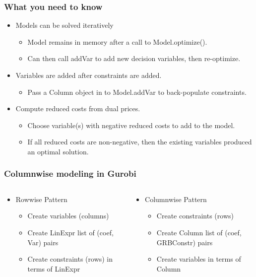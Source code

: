 \documentclass[12pt,handout]{beamer}
\begin{document}
\begin{frame}
\frametitle {What you need to know}
\begin{itemize}
\item Models can be solved iteratively
	\begin{itemize}
	\item Model remains in memory after a call to Model.optimize().
	\item Can then call addVar to add new decision variables, then re-optimize.
	\end{itemize}
\item Variables are added after constraints are added.
     \begin{itemize}
     \item Pass a Column object in to Model.addVar to back-populate constraints.
     \end{itemize}
\item Compute reduced costs from dual prices.
     \begin{itemize}
     \item Choose variable(s) with negative reduced costs to add to the model.
     \item If all reduced costs are non-negative, then the existing variables produced an optimal solution.
     \end{itemize}
\end{itemize}
\end{frame}

\begin{frame}
\frametitle {Columnwise modeling in Gurobi}
\begin{columns}

\begin{column}{0.5\textwidth}
\begin{itemize}
  \item Rowwise Pattern
  \begin{itemize}
    \item Create variables (columns)
    \item Create LinExpr list of (coef, Var) pairs
    \item Create constraints (rows) in terms of LinExpr
  \end{itemize}
\end{itemize}
\end{column}

\begin{column}{0.5\textwidth} 
\begin{itemize}
  \item Columnwise Pattern
  \begin{itemize}
    \item Create constraints (rows)
    \item Create Column list of (coef, GRBConstr) pairs
    \item Create variables in terms of Column
  \end{itemize}
\end{itemize}
\end{column}

\end{columns}
\end{frame}
\end{document}
